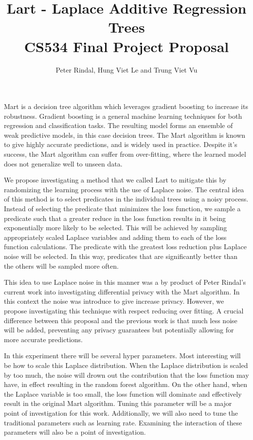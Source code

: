 \documentclass[]{scrartcl}
\title{Lart - Laplace Additive Regression Trees\\ \vspace{0.4cm}
	\large CS534 Final Project Proposal}
\author{Peter Rindal, Hung Viet Le and Trung Viet Vu}
\begin{document}
\maketitle

Mart \cite{friedman2003multiple} is a decision tree algorithm which leverages gradient boosting to increase its robustness. Gradient boosting is a general machine learning techniques for both regression and classification tasks. The resulting model forms an ensemble of weak predictive models, in this case decision trees.   The Mart algorithm is known to give highly accurate predictions\cite{rashmi2015dart}, and is widely used in practice. Despite it's success, the Mart algorithm can suffer from over-fitting, where the learned model does not generalize well to unseen data.

We propose investigating a method that we called Lart to mitigate this by randomizing the learning process with the use of Laplace noise. The central idea of this method is to select predicates in the individual trees using a noisy process. Instead of selecting the predicate that minimizes the loss function, we sample a predicate such that a greater reduce in the loss function results in it being exponentially more likely to be selected. This will be achieved by sampling appropriately scaled Laplace variables and adding them to each of the loss function calculations. The predicate with the greatest loss reduction plus Laplace noise will be selected. In this way, predicates that are significantly better than the others will be sampled more often.

This idea to use Laplace noise in this manner was a by product of Peter Rindal's current work into investigating differential privacy with the Mart algorithm. In this context the noise was introduce to give increase privacy. However, we propose investigating this technique with respect reducing over fitting. A crucial difference between this proposal and the previous work is that much less noise will be added, preventing any privacy guarantees but potentially allowing for more accurate predictions.

In this experiment there will be several hyper parameters. Most interesting will be how to scale this Laplace distribution. When the Laplace distribution is scaled by too much, the noise will drown out the contribution that the loss function may have, in effect resulting in the random forest algorithm. On the other hand, when the Laplace variable is too small, the loss function will dominate and effectively result in the original Mart algorithm. Tuning this parameter will be a major point of investigation for this work. Additionally, we will also need to tune the traditional parameters such as learning rate. Examining the interaction of these parameters will also be a point of investigation.
\end{document}
